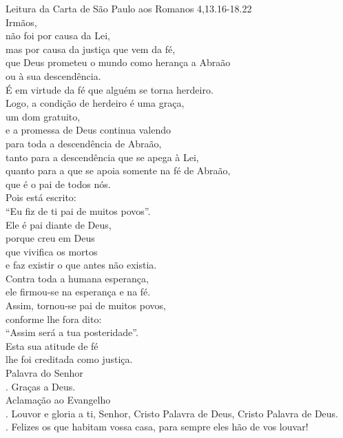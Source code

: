\documentclass{book}
\begin{document}
\begin{flushleft}
    Leitura da Carta de São Paulo aos Romanos
    \hspace{\fill}
    \textcolor{VioletRed2}{4,13.16-18.22}
    \vspace{.2cm} \\
    Irmãos, \\
    não foi por causa da Lei, \\
    mas por causa da justiça que vem da fé, \\
    que Deus prometeu o mundo como herança a Abraão \\
    ou à sua descendência. \\
    É em virtude da fé que alguém se torna herdeiro. \\
    Logo, a condição de herdeiro é uma graça, \\
    um dom gratuito, \\
    e a promessa de Deus continua valendo \\
    para toda a descendência de Abraão, \\
    tanto para a descendência que se apega à Lei, \\
    quanto para a que se apoia somente na fé de Abraão, \\
    que é o pai de todos nós. \\
    Pois está escrito: \\
    ``Eu fiz de ti pai de muitos povos''. \\
    Ele é pai diante de Deus, \\
    porque creu em Deus \\
    que vivifica os mortos \\
    e faz existir o que antes não existia. \\
    Contra toda a humana esperança, \\
    ele firmou-se na esperança e na fé. \\
    Assim, tornou-se pai de muitos povos, \\
    conforme lhe fora dito: \\
    ``Assim será a tua posteridade''. \\
    Esta sua atitude de fé \\
    lhe foi creditada como justiça.
    \vspace{.2cm} \\
    Palavra do Senhor \\
    {\color{VioletRed2} \Rbar.} Graças a Deus.
    \vspace{.2cm} \\
    \textcolor{VioletRed2}{Aclamação ao Evangelho}
    \vspace{.2cm} \\
    {\color{VioletRed2} \Rbar.} Louvor e gloria a ti, Senhor, Cristo Palavra de Deus, Cristo Palavra de Deus. \\
    {\color{VioletRed2} \Vbar.} Felizes os que habitam vossa casa, para sempre eles hão de vos louvar!
\end{flushleft}
\end{document}
